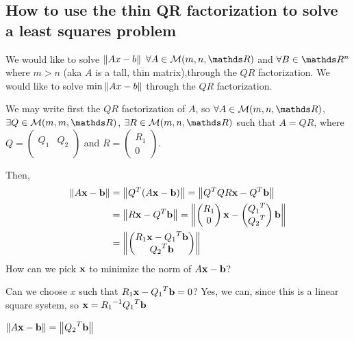 \documentclass[computational_mathematics.tex]{subfiles}
\begin{document}
\subsection{How to use the thin QR factorization to solve a least squares problem}

We would like to solve $\left\lVert Ax-b\right\rVert$ $\forall A \in \mathcal{M}(m, n, \R)$ and $\forall B \in \R^n$ where $m > n$ (aka $A$ is a tall, thin matrix),through the $QR$ factorization.
We would like to solve $\min \left\lVert Ax-b\right\rVert$ through the $QR$ factorization.

We may write first the $QR$ factorization of $A$, so $\forall A \in \mathcal{M}(m, n, \R)$, $\exists Q \in \mathcal{M}(m, m, \R)$, $\exists R \in \mathcal{M}(m, n, \R)$ such that $A = QR$, where 
$Q = \begin{pmatrix}
  &\\
  Q_1 & Q_2\\
  &\\
\end{pmatrix}$ and $R = \begin{pmatrix}
    R_1\\0
\end{pmatrix}$.

Then, 
\begin{equation}
\begin{aligned}
  \left\lVert A\mathbf{x}-\mathbf{b}\right\rVert &= \left\lVert{Q}^{T}(A\mathbf{x}-\mathbf{b})\right\rVert = \left\lVert{Q}^{T}QR\mathbf{x} - {Q}^{T}\mathbf{b}\right\rVert \\
  & = \left\lVert R\mathbf{x}-{Q}^{T}\mathbf{b}\right\rVert = \left\lVert\begin{pmatrix}
    R_1\\0
\end{pmatrix}\mathbf{x} - \begin{pmatrix}
  {Q_{1}}^{T}\\
    {Q_{2}}^{T}
\end{pmatrix}\mathbf{b}\right\rVert\\
&=\left\lVert\begin{pmatrix}
  R_{1} \mathbf{x} - {Q_{1}}^{T} \mathbf{b}\\
    {Q_{2}}^{T}\mathbf{b}
\end{pmatrix}\right\rVert
\end{aligned}
\end{equation}
How can we pick $\mathbf{x}$ to minimize the norm of $A\mathbf{x} - \mathbf{b}$?

Can we choose $x$ such that $R_{1} \mathbf{x} - {Q_{1}}^{T} \mathbf{b} = 0$? Yes, we can, since this is a linear square system, so $\mathbf{x} = {R_{1}}^{-1} {Q_{1}}^{T} \mathbf{b} $

$\left\lVert A\mathbf{x} - \mathbf{b}\right\rVert = \left\lVert{Q_{2}}^{T} \mathbf{b}\right\rVert$
\end{document}
